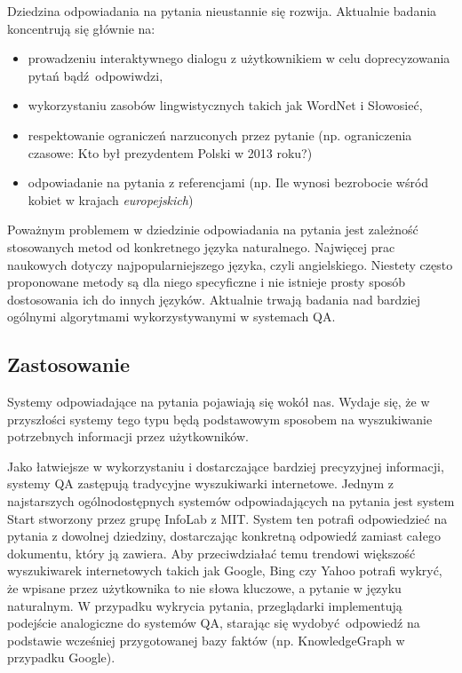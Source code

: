 \documentclass[a4paper, twoside, 12pt]{report}
\begin{document}
            Dziedzina odpowiadania na pytania nieustannie się rozwija. Aktualnie badania koncentrują się głównie na:
            \begin{itemize}
                \item prowadzeniu interaktywnego dialogu z użytkownikiem w celu doprecyzowania pytań bądź odpowiwdzi,
                \item wykorzystaniu zasobów lingwistycznych takich jak WordNet i Słowosieć,
                \item respektowanie ograniczeń narzuconych przez pytanie (np. ograniczenia czasowe: Kto był prezydentem
                    Polski w 2013 roku?)
                \item odpowiadanie na pytania z referencjami (np. Ile wynosi bezrobocie wśród kobiet w krajach \emph{europejskich})
            \end{itemize}
            Poważnym problemem w dziedzinie odpowiadania na pytania jest zależność stosowanych metod od konkretnego języka
            naturalnego. Najwięcej prac naukowych dotyczy najpopularniejszego języka, czyli angielskiego. Niestety
            często proponowane metody są dla niego specyficzne i nie istnieje prosty sposób dostosowania ich do innych
            języków. Aktualnie trwają badania nad bardziej ogólnymi algorytmami wykorzystywanymi w systemach QA.

        \subsection{Zastosowanie}
            Systemy odpowiadające na pytania pojawiają się wokół nas. Wydaje się, że w przyszłości systemy tego typu będą
            podstawowym sposobem na wyszukiwanie potrzebnych informacji przez użytkowników.

            Jako łatwiejsze w wykorzystaniu i dostarczające bardziej precyzyjnej informacji, systemy QA zastępują tradycyjne
            wyszukiwarki internetowe. Jednym z najstarszych ogólnodostępnych systemów odpowiadających na pytania jest
            system Start stworzony przez grupę InfoLab z MIT. System ten potrafi odpowiedzieć na pytania z dowolnej
            dziedziny, dostarczając konkretną odpowiedź zamiast całego dokumentu, który ją zawiera.
            Aby przeciwdziałać temu trendowi  większość wyszukiwarek internetowych takich jak Google, Bing czy Yahoo
            potrafi wykryć, że wpisane przez użytkownika to nie słowa kluczowe, a pytanie w języku naturalnym.
            W przypadku wykrycia pytania, przeglądarki implementują podejście analogiczne do systemów QA, starając się
            wydobyć odpowiedź na podstawie wcześniej przygotowanej bazy faktów (np. KnowledgeGraph w przypadku Google).
\end{document}
